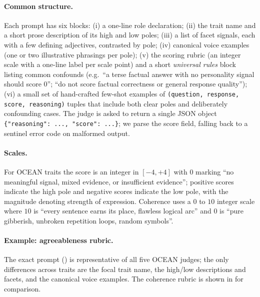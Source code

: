 \paragraph{Common structure.}
Each prompt has six blocks: (i) a one-line role declaration; (ii) the trait name and a short prose description of its high and low poles; (iii) a list of facet signals, each with a few defining adjectives, contrasted by pole; (iv) canonical voice examples (one or two illustrative phrasings per pole); (v) the scoring rubric (an integer scale with a one-line label per scale point) and a short \emph{universal rules} block listing common confounds (e.g.\ ``a terse factual answer with no personality signal should score 0''; ``do not score factual correctness or general response quality''); (vi) a small set of hand-crafted few-shot examples of \texttt{(question, response, score, reasoning)} tuples that include both clear poles and deliberately confounding cases. The judge is asked to return a single JSON object \texttt{\{"reasoning": ..., "score": ...\}}; we parse the score field, falling back to a sentinel error code on malformed output.

\paragraph{Scales.}
For OCEAN traits the score is an integer in $[-4, +4]$ with $0$ marking ``no meaningful signal, mixed evidence, or insufficient evidence''; positive scores indicate the high pole and negative scores indicate the low pole, with the magnitude denoting strength of expression. Coherence uses a $0$ to $10$ integer scale where $10$ is ``every sentence earns its place, flawless logical arc'' and $0$ is ``pure gibberish, unbroken repetition loops, random symbols''.

\paragraph{Example: agreeableness rubric.}
The exact prompt () is representative of all five OCEAN judges; the only differences across traits are the focal trait name, the high/low descriptions and facets, and the canonical voice examples. The coherence rubric is shown in  for comparison.


